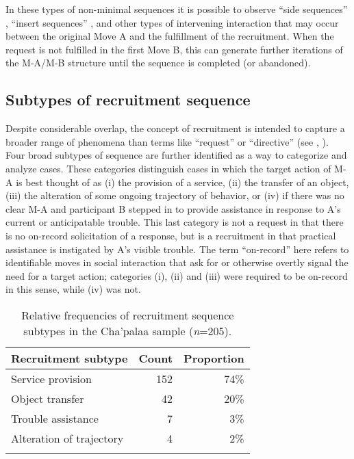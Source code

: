 \documentclass[output=paper]{langsci/langscibook}
\begin{document}
In these types of non-minimal sequences it is possible to observe “side sequences” \citep{jefferson_side_1972}, “insert sequences” \citep[chap. 6]{schegloff_sequence_2007}, and other types of intervening interaction that may occur between the original Move A and the fulfillment of the recruitment. When the request is not fulfilled in the first Move B, this can generate further iterations of the M-A/M-B structure until the sequence is completed (or abandoned).

\subsection{Subtypes of recruitment sequence}\label{sec:floyd:2.3}

Despite considerable overlap, the concept of recruitment is intended to capture a broader range of phenomena than terms like “request” or “directive” (see , ). Four broad subtypes of sequence are further identified as a way to categorize and analyze cases. These categories distinguish cases in which the target action of M-A is best thought of as
(i) the provision of a service,
(ii) the transfer of an object,
(iii) the alteration of some ongoing trajectory of behavior, or
(iv) if there was no clear M-A and participant B stepped in to provide assistance in response to A’s current or anticipatable trouble. This last category is not a request in that there is no on-record solicitation of a response, but is a recruitment in that practical assistance is instigated by A’s visible trouble. The term “on-record” here refers to identifiable moves in social interaction that ask for or otherwise overtly signal the need for a target action; categories (i), (ii) and (iii) were required to be on-record in this sense, while (iv) was not.

\begin{table}
\begin{tabularx}{0.66\textwidth}{Xrr}
\lsptoprule
Recruitment subtype & Count & Proportion\\
\midrule
Service provision & 152 & 74\%\\
Object transfer & 42 & 20\%\\
Trouble assistance & 7 & 3\%\\
Alteration of trajectory & 4 & 2\%\\
\lspbottomrule
\end{tabularx}
\caption{Relative frequencies of recruitment sequence subtypes in the Cha'palaa sample (\textit{n}=205).}
\label{tab:floyd:1}
\end{table}
\end{document}

